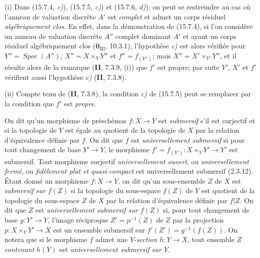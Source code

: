 \begin{remarks}[15.7.7]
\label{IV.15.7.7-fr}
(i) Dans (15.7.4, \emph{c)}), (15.7.5, \emph{c)}) et (15.7.6, \emph{d)}), on peut se restreindre au cas où l'anneau de valuation discrète $A'$ est \emph{complet} et admet un corps résiduel \emph{algébriquement clos}. En effet, dans la démonstration de (15.7.4), si l'on considère un anneau de valuation discrète $A''$ complet dominant $A'$ et ayant un corps résiduel algébriquement clos ($\mathbf{0}_{\mathrm{III}}$, 10.3.1), l'hypothèse \emph{c)} est alors vérifiée pour $Y''=\operatorname{Spec}(A'')$, $X''=X\times_Y Y''$ et $f''=f_{(Y'')}$; mais $X''=X'\times_{Y'}Y''$, et il résulte alors de la remarque (\textbf{II}, 7.3.9, (i)) que $f'$ est propre; par suite $Y'$, $X'$ et $f'$ vérifient aussi l'hypothèse \emph{c)} (\textbf{II}, 7.3.8).

(ii) Compte tenu de (\textbf{II}, 7.3.8), la condition \emph{c)} de (15.7.5) peut se remplacer par la condition que $f'$ est \emph{propre}.
\end{remarks}

\begin{env}[15.7.8]
\label{IV.15.7.8-fr}
On dit qu'un morphisme de préschémas $f:X\to Y$ est \emph{submersif} s'il est surjectif et si la topologie de $Y$ est égale au quotient de la topologie de $X$ par la relation d'équivalence définie par $f$. On dit que $f$ est \emph{universellement submersif} si pour tout changement de base $Y'\to Y$, le morphisme $f'=f_{(Y')}:X\times_Y Y'\to Y'$ est submersif. Tout morphisme surjectif \emph{universellement ouvert}, ou \emph{universellement fermé}, ou \emph{fidèlement plat et quasi-compact} est universellement submersif (2.3.12). Étant donné un morphisme $f:X\to Y$, on dit qu'un sous-ensemble $Z$ de $X$ est \emph{submersif sur $f(Z)$} si la topologie du sous-espace $f(Z)$ de $Y$ est quotient de la topologie du sous-espace $Z$ de $X$ par la relation d'équivalence définie par $f|Z$. On dit que $Z$ est \emph{universellement submersif sur $f(Z)$} si, pour tout changement de base $g:Y'\to Y$, l'image réciproque $Z'=p^{-1}(Z)$ de $Z$ par la projection $p:X\times_Y Y'\to X$ est un ensemble submersif sur $f'(Z')=g^{-1}(f(Z))$. On notera que si le morphisme $f$ admet une $Y$-\emph{section} $h:Y\to X$, tout ensemble $Z$ \emph{contenant} $h(Y)$ est \emph{universellement submersif sur $Y$}.
\end{env}

